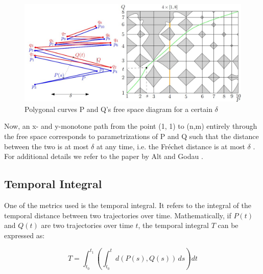 \begin{figure}[!ht]
	\centering
	\includegraphics[width=1.0\linewidth]{figures/Figure.jpg}
	\caption[Polygonal curves P and Q's free space diagram for a certain $\delta$]{Polygonal curves P and Q's free space diagram for a certain $\delta$
 }
	\label{fig:fsd}
\end{figure}
\vspace{1cm}
Now, an x- and y-monotone path from the point (1, 1) to (n,m) entirely through the free space corresponds to parametrizations of P and Q such that the distance between the two is at most $ \delta $  at any time, i.e. the Fréchet distance is at most $ \delta $ . For additional details we refer to the paper by Alt and Godau \cite{AltGodau}.

\subsection{Temporal Integral}
One of the metrics used is the temporal integral. It refers to the integral of the temporal distance between two trajectories over time. Mathematically, if \( P(t) \) and \( Q(t) \) are two trajectories over time \( t \), the temporal integral \( T \) can be expressed as:

\[ T = \int_{t_0}^{t_1} \left( \int_{t_0}^{t} d(P(s), Q(s)) \, ds \right) dt \]

